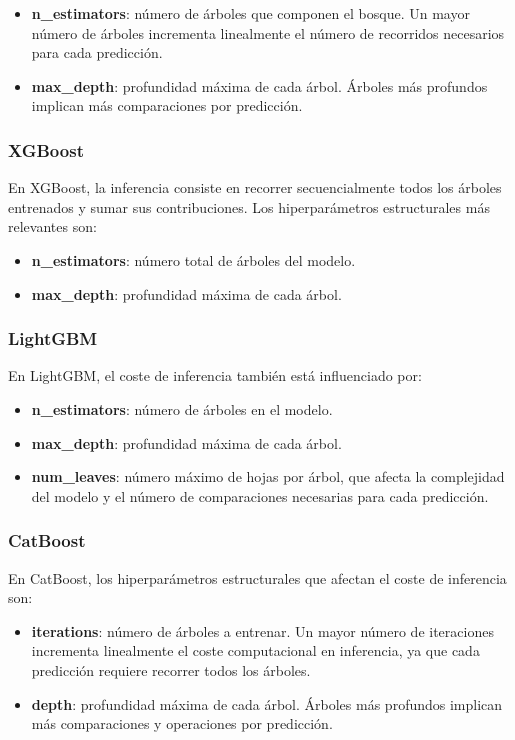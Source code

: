 \begin{itemize}
    \item \textbf{n\_estimators}: número de árboles que componen el bosque. Un mayor número de árboles incrementa linealmente el número de recorridos necesarios para cada predicción.
    \item \textbf{max\_depth}: profundidad máxima de cada árbol. Árboles más profundos implican más comparaciones por predicción.
\end{itemize}

\subsubsection{XGBoost}

En XGBoost, la inferencia consiste en recorrer secuencialmente todos los árboles entrenados y sumar sus contribuciones. Los hiperparámetros estructurales más relevantes son:

\begin{itemize}
    \item \textbf{n\_estimators}: número total de árboles del modelo.
    \item \textbf{max\_depth}: profundidad máxima de cada árbol.
\end{itemize}

\subsubsection{LightGBM}

En LightGBM, el coste de inferencia también está influenciado por:
\begin{itemize}
    \item \textbf{n\_estimators}: número de árboles en el modelo.
    \item \textbf{max\_depth}: profundidad máxima de cada árbol.
    \item \textbf{num\_leaves}: número máximo de hojas por árbol, que afecta la complejidad del modelo y el número de comparaciones necesarias para cada predicción.
\end{itemize}

\subsubsection{CatBoost}

En CatBoost, los hiperparámetros estructurales que afectan el coste de inferencia son:

\begin{itemize}
    \item \textbf{iterations}: número de árboles a entrenar. Un mayor número de iteraciones incrementa linealmente el coste computacional en inferencia, ya que cada predicción requiere recorrer todos los árboles.
    \item \textbf{depth}: profundidad máxima de cada árbol. Árboles más profundos implican más comparaciones y operaciones por predicción.
\end{itemize}


